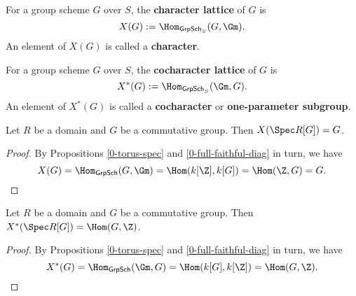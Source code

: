 \begin{definition}
  \label{0-char}
  \leanok

  For a group scheme $G$ over $S$, the {\bf character lattice} of $G$ is
  \[
    X(G) := \Hom_{\mathsf{GrpSch}_S}(G, \Gm).
  \]
  An element of $X(G)$ is called a {\bf character}.
\end{definition}


\begin{definition}
  \label{0-cochar}
  \leanok

  For a group scheme $G$ over $S$, the {\bf cocharacter lattice} of $G$ is
  \[
    X^*(G) := \Hom_{\mathsf{GrpSch}_S}(\Gm, G).
  \]
  An element of $X^*(G)$ is called a {\bf cocharacter} or {\bf one-parameter subgroup}.
\end{definition}


\begin{proposition}
  \label{0-char-diag}
  \leanok

  Let $R$ be a domain and $G$ be a commutative group.
  Then $X(\Spec R[G]) = G$.
\end{proposition}
\begin{proof}
  \leanok

  By Propositions \ref{0-torus-spec} and \ref{0-full-faithful-diag} in turn, we have
  \[
    X(G) = \Hom_{\mathsf{GrpSch}}(G, \Gm) = \Hom(k[\Z], k[G]) = \Hom(\Z, G) = G.
  \]
\end{proof}


\begin{proposition}
  \label{0-cochar-diag}
  \leanok

  Let $R$ be a domain and $G$ be a commutative group.
  Then $X^*(\Spec R[G]) = \Hom(G, \Z)$.
\end{proposition}
\begin{proof}
  \leanok

  By Propositions \ref{0-torus-spec} and \ref{0-full-faithful-diag} in turn, we have
  \[
    X^*(G) = \Hom_{\mathsf{GrpSch}}(\Gm, G) = \Hom(k[G], k[\Z]) = \Hom(G, \Z).
  \]
\end{proof}


